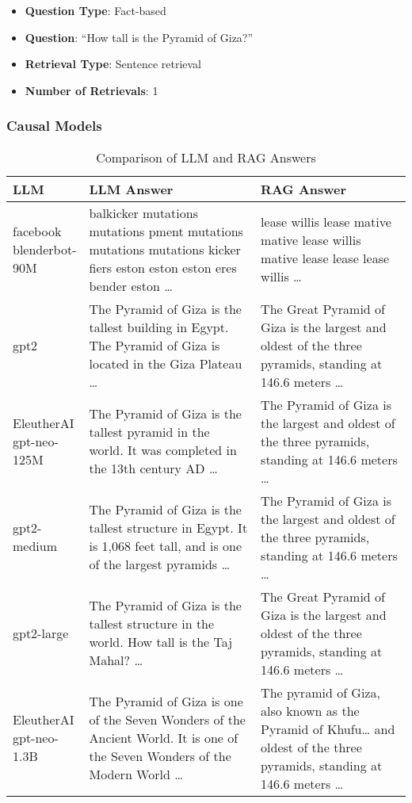 \documentclass{wseas}
\begin{document}
\begin{itemize}
\item
  \textbf{Question Type}: Fact-based
\item
  \textbf{Question}: ``How tall is the Pyramid of Giza?''
\item
  \textbf{Retrieval Type}: Sentence retrieval
\item
  \textbf{Number of Retrievals}: 1
\end{itemize}

\subsubsection{Causal Models}


\begin{table*}[htbp]
\centering
\begin{tabular}{|p{0.10\linewidth}|p{0.48\linewidth}|p{0.42\linewidth}|}
\hline
\textbf{LLM} & \textbf{LLM Answer} & \textbf{RAG Answer} \\ \hline
facebook blenderbot-90M & balkicker mutations mutations pment mutations mutations mutations kicker fiers eston eston eston eres bender eston \ldots{} & lease willis lease mative mative lease willis mative lease lease lease willis \ldots{} \\ \hline
gpt2 & The Pyramid of Giza is the tallest building in Egypt. The Pyramid of Giza is located in the Giza Plateau \ldots{} & The Great Pyramid of Giza is the largest and oldest of the three pyramids, standing at 146.6 meters \ldots{} \\ \hline
EleutherAI gpt-neo-125M & The Pyramid of Giza is the tallest pyramid in the world. It was completed in the 13th century AD \ldots{} & The Pyramid of Giza is the largest and oldest of the three pyramids, standing at 146.6 meters \ldots{} \\ \hline
gpt2-medium & The Pyramid of Giza is the tallest structure in Egypt. It is 1,068 feet tall, and is one of the largest pyramids \ldots{} & The Pyramid of Giza is the largest and oldest of the three pyramids, standing at 146.6 meters \ldots{} \\ \hline
gpt2-large & The Pyramid of Giza is the tallest structure in the world. How tall is the Taj Mahal? \ldots{} & The Great Pyramid of Giza is the largest and oldest of the three pyramids, standing at 146.6 meters \ldots{} \\ \hline
EleutherAI gpt-neo-1.3B & The Pyramid of Giza is one of the Seven Wonders of the Ancient World. It is one of the Seven Wonders of the Modern World \ldots{} & The pyramid of Giza, also known as the Pyramid of Khufu\ldots{} and oldest of the three pyramids, standing at 146.6 meters \ldots{} \\ \hline
\end{tabular}
\caption{Comparison of LLM and RAG Answers}
\end{table*}
\end{document}
